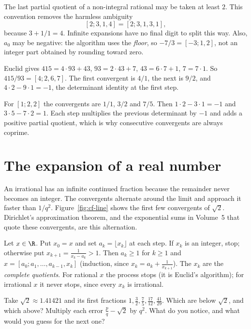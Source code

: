 The last partial quotient of a non-integral rational may be taken at least $2$. This convention removes the harmless ambiguity
\[
[2;3,1,4]=[2;3,1,3,1],
\]
because $3+1/1=4$. Infinite expansions have no final digit to split this way. Also, $a_0$ may be negative: the algorithm uses the \emph{floor}, so $-7/3=[-3;1,2]$, not an integer part obtained by rounding toward zero.

\begin{examplex}
Euclid gives $415=4\cdot 93+43$, $93=2\cdot 43+7$, $43=6\cdot 7+1$, $7=7\cdot 1$. So $415/93=[4;2,6,7]$. The first convergent is $4/1$, the next is $9/2$, and $4\cdot 2-9\cdot 1=-1$, the determinant identity at the first step.
\end{examplex}

\begin{examplex}
For $[1;2,2]$ the convergents are $1/1$, $3/2$ and $7/5$. Then $1\cdot 2-3\cdot 1=-1$ and $3\cdot 5-7\cdot 2=1$. Each step multiplies the previous determinant by $-1$ and adds a positive partial quotient, which is why consecutive convergents are always coprime.
\end{examplex}

\section{The expansion of a real number}

An irrational has an infinite continued fraction because the remainder never becomes an integer. The convergents alternate around the limit and approach it faster than $1/q^2$. Figure~\ref{fig:cf-line} shows the first few convergents of $\sqrt 2$. Dirichlet's approximation theorem, and the exponential sums in Volume~5 that quote these convergents, are this alternation.

Let $x\in\R$. Put $x_0=x$ and set $a_k=\lfloor x_k\rfloor$ at each step. If $x_k$ is an integer, stop; otherwise put $x_{k+1}=\frac1{x_k-a_k}>1$. Then $a_k\ge1$ for $k\ge1$ and $x=[a_0;a_1,\dots,a_{k-1},x_k]$ (induction, since $x_k=a_k+\frac1{x_{k+1}}$). The $x_k$ are the \emph{complete quotients}. For rational $x$ the process stops (it is Euclid's algorithm); for irrational $x$ it never stops, since every $x_k$ is irrational.

\begin{think}
Take $\sqrt2\approx1.41421$ and its first fractions $1,\frac32,\frac75,\frac{17}{12},\frac{41}{29}$. Which are below $\sqrt2$, and which above? Multiply each error $\frac pq-\sqrt2$ by $q^2$. What do you notice, and what would you guess for the next one?
\end{think}

